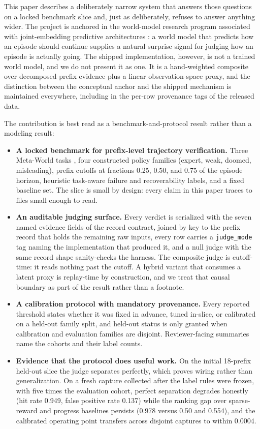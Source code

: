 \documentclass[11pt]{article}
\newcommand{\judgemode}[1]{\texttt{#1}}
\begin{document}
This paper describes a deliberately narrow system that answers those questions on a locked
benchmark slice and, just as deliberately, refuses to answer anything wider. The project is
anchored in the world-model research program associated with joint-embedding predictive
architectures \citep{lecun2022path, assran2023ijepa, bardes2024vjepa}: a world model that
predicts how an episode should continue supplies a natural surprise signal for judging how an
episode is actually going. The shipped implementation, however, is not a trained world model,
and we do not present it as one. It is a hand-weighted composite over decomposed prefix
evidence plus a linear observation-space proxy, and the distinction between the conceptual
anchor and the shipped mechanism is maintained everywhere, including in the per-row
provenance tags of the released data.

The contribution is best read as a benchmark-and-protocol result rather than a modeling
result:

\begin{itemize}
  \item \textbf{A locked benchmark for prefix-level trajectory verification.} Three
  Meta-World tasks \citep{yu2020metaworld}, four constructed policy families (expert, weak,
  doomed, misleading), prefix cutoffs at fractions 0.25, 0.50, and 0.75 of the episode
  horizon, heuristic task-aware failure and recoverability labels, and a fixed baseline set.
  The slice is small by design: every claim in this paper traces to files small enough to
  read.
  \item \textbf{An auditable judging surface.} Every verdict is serialized with the seven
  named evidence fields of the record contract, joined by key to the prefix record that holds
  the remaining raw inputs, every row carries a \judgemode{judge\_mode} tag naming the
  implementation that produced it, and a null judge with the same record shape sanity-checks
  the harness. The composite judge is cutoff-time: it reads nothing past the
  cutoff. A hybrid variant that consumes a latent proxy is replay-time by construction, and
  we treat that causal boundary as part of the result rather than a footnote.
  \item \textbf{A calibration protocol with mandatory provenance.} Every reported threshold
  states whether it was fixed in advance, tuned in-slice, or calibrated on a held-out family
  split, and held-out status is only granted when calibration and evaluation families are
  disjoint. Reviewer-facing summaries name the cohorts and their label counts.
  \item \textbf{Evidence that the protocol does useful work.} On the initial 18-prefix
  held-out slice the judge separates perfectly, which proves wiring rather than
  generalization. On a fresh capture collected after the label rules were frozen, with five
  times the evaluation cohort, perfect separation degrades honestly (hit rate 0.949, false
  positive rate 0.137) while the ranking gap over sparse-reward and progress baselines
  persists (0.978 versus 0.50 and 0.554), and the calibrated operating point transfers across
  disjoint captures to within 0.0004.
\end{itemize}
\end{document}
